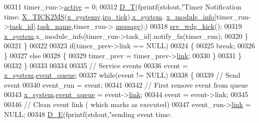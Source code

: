 \begin{DoxyCode}
00311                     timer\_run->\hyperlink{a00036_a11c9c2b8514210c037aa45241ca62fb3}{active} = 0;
00312                     \hyperlink{a00040_a5e876f6543757da83f9b3ddee08dece7}{D\_T}(fprintf(stdout,\textcolor{stringliteral}{"Timer Notification time:%
      \hyperlink{a00036_a8c687347943f251bc052fa9a43a2b69b}{X\_TICK2MS}(\hyperlink{a00037_ad839c033d3d00cdcc6032038182be270}{x\_systemv}.\hyperlink{a00037_ab73fa103937ad39e7e2fc55783c4c370}{irq\_tick}),\hyperlink{a00037_ae4d7967b507ca26e3ee1231215b03321}{x\_system}.
      \hyperlink{a00037_a6724d1e1430a0e89c134b30152988385}{x\_module\_info}[timer\_run->\hyperlink{a00036_a21b41e494a28583d4da10f1afb1c5328}{task\_id}].\hyperlink{a00037_a530a0539bc1522a85f661b6e1c9ebebd}{task\_name},timer\_run->
      \hyperlink{a00036_adf9665938515a20c283eea2c978cf80d}{message});)
00318                     \hyperlink{a00067_a710d148845397582739d170341f3d3d9}{srv\_wdg\_kick}();
00319                     \hyperlink{a00037_ae4d7967b507ca26e3ee1231215b03321}{x\_system}.x\_module\_info[timer\_run->task\_id].notify\_fn(timer\_run);
00320                  \}
00321             \}
00322 
00323             if(timer\_prev->link == NULL)
00324             \{
00325                 \textcolor{keywordflow}{break};
00326             \}
00327             \textcolor{keywordflow}{else}
00328             \{
00329                 timer\_prev = timer\_prev->\hyperlink{a00036_ac1b431c0d2de68ce090f223b32f212b5}{link};
00330             \}
00331         \}
00332     \}
00333 
00334 
00335     \textcolor{comment}{// Service events}
00336     \textcolor{keyword}{event} = \hyperlink{a00037_ae4d7967b507ca26e3ee1231215b03321}{x\_system}.\hyperlink{a00037_aae3e0af6b968bca8cea3ebff4b8918cb}{event\_queue};
00337     \textcolor{keywordflow}{while}(event != NULL)
00338     \{
00339         \textcolor{comment}{// Send event}
00340         event\_run = event;
00341 
00342         \textcolor{comment}{// First remove event from queue}
00343         \hyperlink{a00037_ae4d7967b507ca26e3ee1231215b03321}{x\_system}.\hyperlink{a00037_aae3e0af6b968bca8cea3ebff4b8918cb}{event\_queue} = \textcolor{keyword}{event}->\hyperlink{a00036_aab03e4ec45a7b861ab6ed51f64f58fda}{link};
00344         \textcolor{keyword}{event} = \textcolor{keyword}{event}->link;
00345 
00346         \textcolor{comment}{// Clean event link ( which marks as executed)}
00347         event\_run->\hyperlink{a00036_aab03e4ec45a7b861ab6ed51f64f58fda}{link} = NULL;
00348         \hyperlink{a00040_ae8251f649f2077b9d0de5a10e6c2cf79}{D\_E}(fprintf(stdout,\textcolor{stringliteral}{"sending event time:%
}}
\end{DoxyCode}
